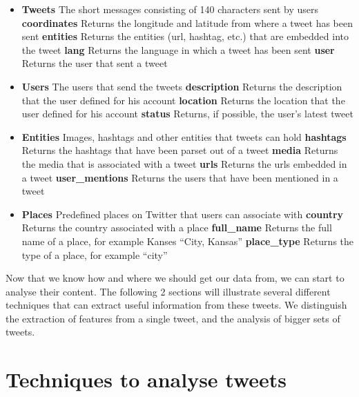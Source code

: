 \documentclass{article}
\begin{document}
\begin{itemize}
\item \textbf{Tweets} The short messages consisting of 140 characters sent by users
	\subitem \textbf{coordinates} Returns the longitude and latitude from where a tweet has been sent
	\subitem \textbf{entities} Returns the entities (url, hashtag, etc.) that are embedded into the tweet
	\subitem \textbf{lang} Returns the language in which a tweet has been sent
	\subitem \textbf{user} Returns the user that sent a tweet
\item \textbf{Users} The users that send the tweets
	\subitem \textbf{description} Returns the description that the user defined for his account
	\subitem \textbf{location} Returns the location that the user defined for his account
	\subitem \textbf{status} Returns, if possible, the user's latest tweet
\item \textbf{Entities} Images, hashtags and other entities that tweets can hold
	\subitem \textbf{hashtags} Returns the hashtags that have been parset out of a tweet
	\subitem \textbf{media} Returns the media that is associated with a tweet
	\subitem \textbf{urls} Returns the urls embedded in a tweet
	\subitem \textbf{user\_mentions} Returns the users that have been mentioned in a tweet
\item \textbf{Places} Predefined places on Twitter that users can associate with
	\subitem \textbf{country} Returns the country associated with a place
	\subitem \textbf{full\_name} Returns the full name of a place, for example Kanses ``City, Kansas''
	\subitem \textbf{place\_type} Returns the type of a place, for example ``city''
\end{itemize}

Now that we know how and where we should get our data from, we can start to analyse their content. The following 2 sections will illustrate
several different techniques that can extract useful information from these tweets. We distinguish the extraction of features from a single tweet,
and the analysis of bigger sets of tweets.

\section{Techniques to analyse tweets}

\end{document}
